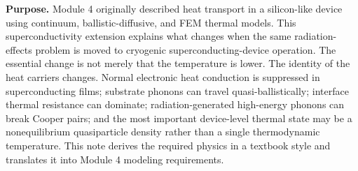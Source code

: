 \documentclass[11pt]{article}
\begin{document}

\begin{overviewbox}
\textbf{Purpose.} Module 4 originally described heat transport in a silicon-like device using continuum, ballistic-diffusive, and FEM thermal models. This superconductivity extension explains what changes when the same radiation-effects problem is moved to cryogenic superconducting-device operation. The essential change is not merely that the temperature is lower. The identity of the heat carriers changes. Normal electronic heat conduction is suppressed in superconducting films; substrate phonons can travel quasi-ballistically; interface thermal resistance can dominate; radiation-generated high-energy phonons can break Cooper pairs; and the most important device-level thermal state may be a nonequilibrium quasiparticle density rather than a single thermodynamic temperature. This note derives the required physics in a textbook style and translates it into Module 4 modeling requirements.
\end{overviewbox}

\ProjectTOC
\end{document}
